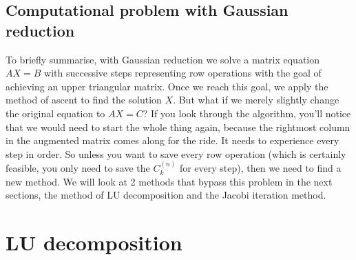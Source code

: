 \subsection{Computational problem with Gaussian reduction}
To briefly summarise, with Gaussian reduction we solve a matrix equation $AX=B$ with successive steps representing row operations with the goal of achieving an upper triangular matrix. Once we reach this goal, we apply the method of ascent to find the solution $X$. But what if we merely slightly change the original equation to $AX=C$? If you look through the algorithm, you'll notice that we would need to start the whole thing again, because the rightmost column in the augmented matrix comes along for the ride. It needs to experience every step in order. So unless you want to save every row operation (which is certainly feasible, you only need to save the $C^{(n)}_k$ for every step), then we need to find a new method. We will look at 2 methods that bypass this problem in the next sections, the method of LU decomposition and the Jacobi iteration method.

\section{LU decomposition}


